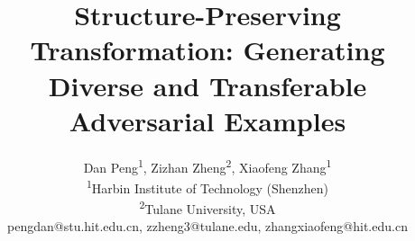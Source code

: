 \documentclass[letterpaper]{article} %
\newcommand{\red}[1]{{\color{red} #1}}
\newcommand{\blue}[1]{{\color{blue} #1}}
\begin{document}
%
\title{Structure-Preserving Transformation: Generating Diverse and Transferable Adversarial Examples %
}
\author{
}
\author{Dan Peng\textsuperscript{1},
Zizhan Zheng\textsuperscript{2},
Xiaofeng Zhang\textsuperscript{1}\\
\textsuperscript{1}{Harbin Institute of Technology (Shenzhen)}\\
\textsuperscript{2}{Tulane University, USA}\\
pengdan@stu.hit.edu.cn,
zzheng3@tulane.edu,
zhangxiaofeng@hit.edu.cn}
\maketitle


%
%
%


%
\maketitle
\end{document}
